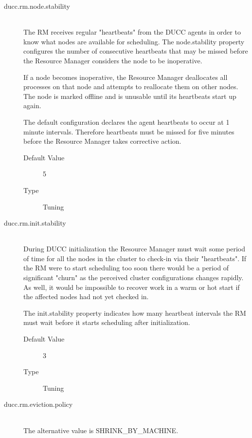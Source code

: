 \begin{description}
        \item[ducc.rm.node.stability] \hfill \\
          The RM receives regular "heartbeats" from the DUCC agents in order to know what 
          nodes are available for scheduling. The node.stability property configures the number of 
          consecutive heartbeats that may be missed before the Resource Manager considers the 
          node to be inoperative. 

          If a node becomes inoperative, the Resource Manager deallocates all processes on that 
          node and attempts to reallocate them on other nodes. The node is marked offline and is 
          unusable until its heartbeats start up again. 
          
          The default configuration declares the agent heartbeats to occur at 1 minute intervals. 
          Therefore heartbeats must be missed for five minutes before the Resource Manager takes 
          corrective action. 
          \begin{description}
            \item[Default Value] 5 
            \item[Type] Tuning 
          \end{description}
          

        \item[ducc.rm.init.stability] \hfill \\
          During DUCC initialization the Resource Manager must wait some period of time for 
          all the nodes in the cluster to check-in via their "heartbeats". If the RM were to start 
          scheduling too soon there would be a period of significant "churn" as the perceived cluster 
          configurations changes rapidly. As well, it would be impossible to recover work in a warm 
          or hot start if the affected nodes had not yet checked in. 
          
          The init.stability property indicates how many heartbeat intervals the RM must wait before 
          it starts scheduling after initialization. 
          \begin{description}            
            \item[Default Value] 3 
            \item[Type] Tuning 
          \end{description}
          
        \item[ducc.rm.eviction.policy] \hfill \\
          The alternative value is SHRINK\_BY\_MACHINE. 


\end{description}
